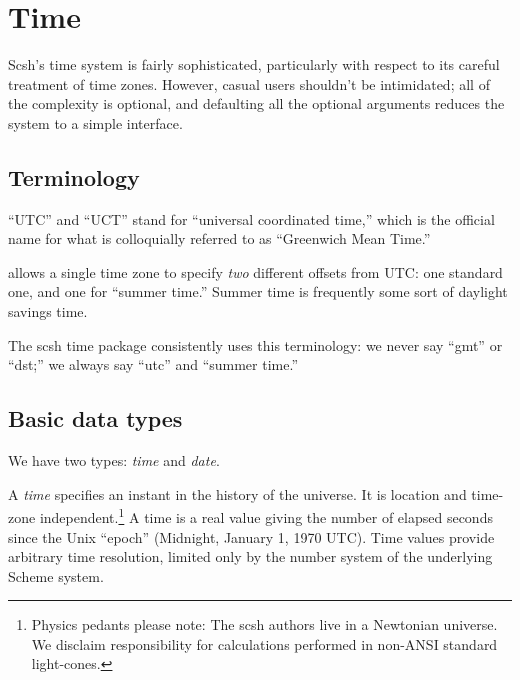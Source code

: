
\section{Time}
\label{sec:time}

Scsh's time system is fairly sophisticated, particularly with respect
to its careful treatment of time zones.
However, casual users shouldn't be intimidated;
all of the complexity is optional, 
and defaulting all the optional arguments reduces the system
to a simple interface.

\subsection{Terminology}
``UTC'' and ``UCT'' stand for ``universal coordinated time,'' which is the 
official name for what is colloquially referred to as ``Greenwich Mean
Time.''

{\Posix} allows a single time zone to specify \emph{two} different offsets
from UTC: one standard one, and one for ``summer time.''
Summer time is frequently some sort of daylight savings time. 

The scsh time package consistently uses this terminology: we never say
``gmt'' or ``dst;'' we always say ``utc'' and ``summer time.''

\subsection{Basic data types}    
We have two types: \emph{time} and \emph{date}.

A \emph{time} specifies an instant in the history of the universe.
It is location and time-zone independent.\footnote{Physics pedants please note:
    The scsh authors live in a Newtonian universe. We disclaim responsibility
    for calculations performed in non-ANSI standard light-cones.}
A time is a real value
giving the number of elapsed seconds since the Unix ``epoch''
(Midnight, January 1, 1970 UTC).
Time values provide arbitrary time resolution,
limited only by the number system of the underlying Scheme system.

